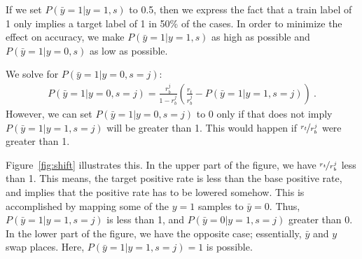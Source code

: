 If we set $P(\bar{y}=1|y=1,s)$ to 0.5,
then we express the fact that a train label of 1 only implies a target label of 1 in 50\% of the cases.
In order to minimize the effect on accuracy,
we make $P(\bar{y}=1|y=1,s)$ as high as possible and $P(\bar{y}=1|y=0,s)$ as low as possible.

We solve for $P(\bar{y}=1|y=0,s=j)$:
\begin{align}
  P(\bar{y}=1|y=0,s=j) = \frac{r_b^j}{1-r_b^j} \left(\frac{r_t}{r_b^j} - P(\bar{y}=1|y=1,s=j)\right)~.
\end{align}
However, we can set $P(\bar{y}=1|y=0,s=j)$ to 0
only if that does not imply $P(\bar{y}=1|y=1,s=j)$ will be greater than 1.
This would happen if $\nicefrac{r_t}{r_b^j}$ were greater than 1.

Figure~\ref{fig:shift} illustrates this.
In the upper part of the figure, we have $\nicefrac{r_t}{r_b^j}$ less than 1.
This means, the target positive rate is less than the base positive rate,
and implies that the positive rate has to be lowered somehow.
This is accomplished by mapping some of the $y=1$ samples to $\bar{y}=0$.
Thus, $P(\bar{y}=1|y=1,s=j)$ is less than 1, and $P(\bar{y}=0|y=1,s=j)$ greater than 0.
In the lower part of the figure, we have the opposite case; essentially, $\bar{y}$ and $y$ swap places.
Here, $P(\bar{y}=1|y=1,s=j)=1$ is possible.






% 
